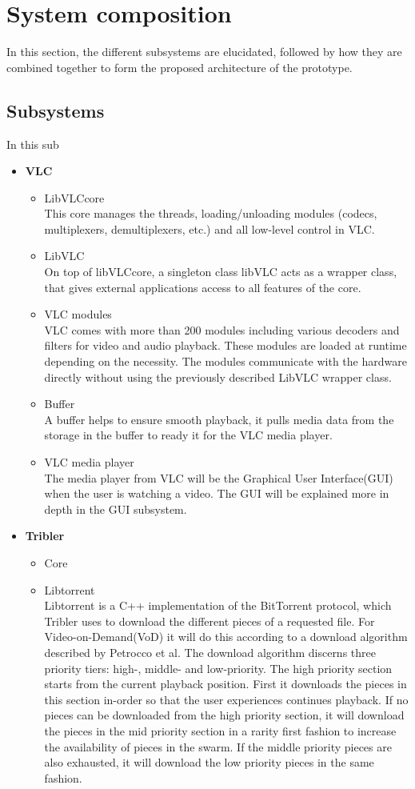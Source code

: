 \section{System composition}
In this section, the different subsystems are elucidated, followed by how they are combined together to form the proposed architecture of the prototype.
\subsection{Subsystems}
In this sub
\begin{itemize}
\item \textbf{VLC}
	\begin{itemize}
		\item LibVLCcore\\
This core manages the threads, loading/unloading modules (codecs, multiplexers, demultiplexers, etc.) and all low-level control in VLC.
		\item LibVLC\\
On top of libVLCcore, a singleton class libVLC acts as a wrapper class, that gives external applications access to all features of the core.
		\item VLC modules\\
VLC comes with more than 200 modules including various decoders and filters for video and audio playback. These modules are loaded at runtime depending on the necessity. The modules communicate with the hardware directly without using the previously described LibVLC wrapper class.
		\item Buffer\\
A buffer helps to ensure smooth playback, it pulls media data from the storage in the buffer to ready it for the VLC media player.
		\item VLC media player\\
The media player from VLC will be the Graphical User Interface(GUI) when the user is watching a video. The GUI will be explained more in depth in the GUI subsystem.
	\end{itemize}
\item \textbf{Tribler}
	\begin{itemize}
		\item Core\\
		\item Libtorrent\\
Libtorrent is a C++ implementation of the BitTorrent protocol, which Tribler uses to download the different pieces of a requested file. For Video-on-Demand(VoD) it will do this according to a download algorithm described by Petrocco et al\cite{libswift12}. The download algorithm discerns three priority tiers: high-, middle- and low-priority. The high priority section starts from the current playback position. First it downloads the pieces in this section in-order so that the user experiences continues playback. If no pieces can be downloaded from the high priority section, it will download the pieces in the mid priority section in a rarity first fashion to increase the availability of pieces in the swarm. If the middle priority pieces are also exhausted, it will download the low priority pieces in the same fashion. 

\end{itemize}
\end{itemize}
